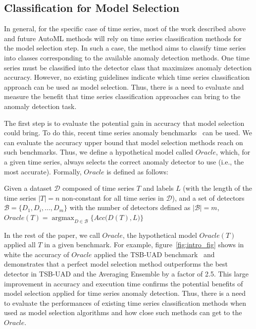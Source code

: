 \vspace{-0.1cm}
\subsection{Classification for Model Selection}

In general, for the specific case of time series, most of the work described above and future AutoML methods will rely on time series classification methods for the model selection step. In such a case, the method aims to classify time series into classes corresponding to the available anomaly detection methods. One time series must be classified into the detector class that maximizes anomaly detection accuracy. However, no existing guidelines indicate which time series classification approach can be used as model selection. Thus, there is a need to evaluate and measure the benefit that time series classification approaches can bring to the anomaly detection task.

The first step is to evaluate the potential gain in accuracy that model selection could bring. To do this, recent time series anomaly benchmarks~\cite{10.14778/3529337.3529354, 10.14778/3538598.3538602} can be used. We can evaluate the accuracy upper bound that model selection methods reach on such benchmarks. Thus, we define a hypothetical model called $Oracle$, which, for a given time series, always selects the correct anomaly detector to use (i.e., the most accurate). Formally, $Oracle$ is defined as follows:

\vspace{-0.05cm}
\begin{definition}
Given a dataset $\mathcal{D}$ composed of time series $T$ and labels $L$ (with the length of the time series $|T|=n$ non-constant for all time series in $\mathcal{D}$), and a set of detectors $\mathcal{B} = \{D_1, D_i, ..., D_m\}$ with the number of detectors defined as $|\mathcal{B}|=m$, $Oracle(T)= \operatorname*{argmax}_{D \in \mathcal{B}} \big\{Acc\big(D(T),L\big)\big\}$ 
\vspace{-0.05cm}
\end{definition}

In the rest of the paper, we call $Oracle$, the hypothetical model $Oracle(T)$ applied  all $T$ in a given benchmark. For example, figure~\ref{fig:intro_fig} shows in white the accuracy of $Oracle$ applied  the TSB-UAD benchmark~\cite{10.14778/3529337.3529354} and demonstrates that a perfect model selection method outperforms the best detector in TSB-UAD and the Averaging Ensemble by a factor of 2.5. This large improvement in accuracy and execution time confirms the potential benefits of model selection applied for time series anomaly detection. Thus, there is a need to evaluate the performances of existing time series classification methods when used as model selection algorithms and how close such methods can get to the $Oracle$.


